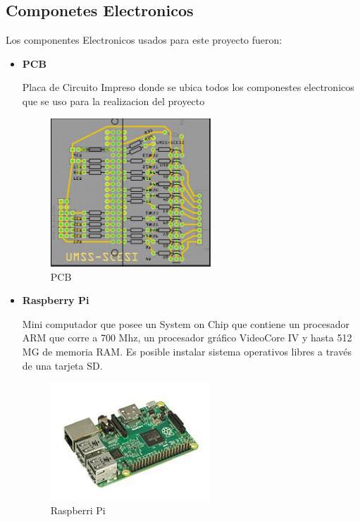 \documentclass[letterpaper,12pt]{article}
\begin{document}
{\begin{itemize}
\begin{itemize}
			\end{itemize}
			
		\end{itemize}
		
		\subsection{Componetes Electronicos}
		Los componentes Electronicos usados para este proyecto fueron:\\
		\begin{itemize}
			\item \textbf{PCB}
			
			Placa de Circuito Impreso donde  se ubica todos los componestes electronicos que se uso para la realizacion del proyecto
			
			\begin{figure}[h]
				\centering
				\begin{minipage}[t]{5.5cm}
					\includegraphics[width=6cm]{images/PCB.jpeg}	 %
					\caption{ PCB}
				\end{minipage}
				
			\end{figure}
			
			
			\item \textbf{Raspberry Pi}
			
			Mini computador que  posee un System on Chip que contiene un procesador ARM que corre a 700 Mhz, un procesador gráfico VideoCore IV y hasta 512 MG de memoria RAM. Es posible instalar sistema operativos libres a través de una tarjeta SD.
			
			\begin{figure}[h]
				\centering
				\begin{minipage}[t]{5.5cm}
					\includegraphics[width=6cm]{images/RaspberryPI.jpg}	 %
					\caption{ Raspberri Pi}
				\end{minipage}
				

\end{figure}
\end{itemize}}
\end{document}
